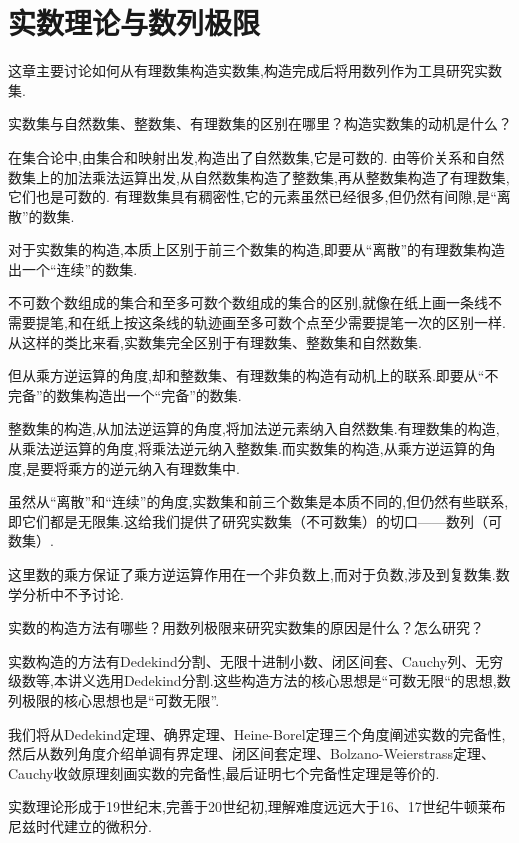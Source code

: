 \chapter{实数理论与数列极限}

这章主要讨论如何从有理数集构造实数集,构造完成后将用数列作为工具研究实数集.

\begin{note}实数集与自然数集、整数集、有理数集的区别在哪里？构造实数集的动机是什么？

在集合论中,由集合和映射出发,构造出了自然数集,它是可数的.
由等价关系和自然数集上的加法乘法运算出发,从自然数集构造了整数集,再从整数集构造了有理数集,它们也是可数的.
有理数集具有稠密性,它的元素虽然已经很多,但仍然有间隙,是“离散”的数集.

对于实数集的构造,本质上区别于前三个数集的构造,即要从“离散”的有理数集构造出一个“连续”的数集.

不可数个数组成的集合和至多可数个数组成的集合的区别,就像在纸上画一条线不需要提笔,和在纸上按这条线的轨迹画至多可数个点至少需要提笔一次的区别一样.从这样的类比来看,实数集完全区别于有理数集、整数集和自然数集.

但从乘方逆运算的角度,却和整数集、有理数集的构造有动机上的联系.即要从“不完备”的数集构造出一个“完备”的数集.

整数集的构造,从加法逆运算的角度,将加法逆元素纳入自然数集.有理数集的构造,从乘法逆运算的角度,将乘法逆元纳入整数集.而实数集的构造,从乘方逆运算的角度,是要将乘方的逆元纳入有理数集中.
\end{note}

\begin{remark}
    虽然从“离散”和“连续”的角度,实数集和前三个数集是本质不同的,但仍然有些联系,即它们都是无限集.这给我们提供了研究实数集（不可数集）的切口——数列（可数集）.
\end{remark}

\begin{remark}
    这里数的乘方保证了乘方逆运算作用在一个非负数上,而对于负数,涉及到复数集.数学分析中不予讨论.%
\end{remark}

\begin{note}实数的构造方法有哪些？用数列极限来研究实数集的原因是什么？怎么研究？

    实数构造的方法有Dedekind分割、无限十进制小数、闭区间套、Cauchy列、无穷级数等,本讲义选用Dedekind分割.这些构造方法的核心思想是“可数无限“的思想,数列极限的核心思想也是“可数无限”.

    我们将从Dedekind定理、确界定理、Heine-Borel定理三个角度阐述实数的完备性,然后从数列角度介绍单调有界定理、闭区间套定理、Bolzano-Weierstrass定理、Cauchy收敛原理刻画实数的完备性,最后证明七个完备性定理是等价的.
    
\end{note}

\begin{remark}
    实数理论形成于19世纪末,完善于20世纪初,理解难度远远大于16、17世纪牛顿莱布尼兹时代建立的微积分.
\end{remark}



